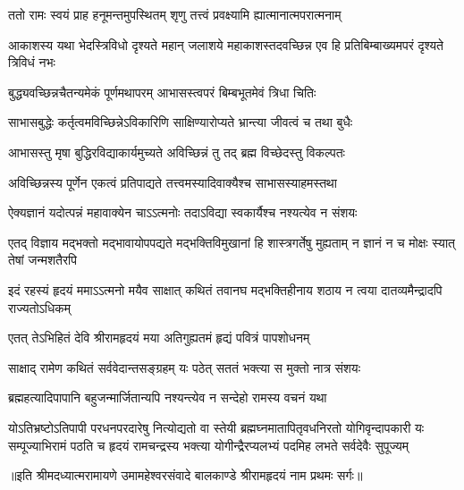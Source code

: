 \twolineshloka
{ततो रामः स्वयं प्राह हनूमन्तमुपस्थितम्}
{शृणु तत्त्वं प्रवक्ष्यामि ह्यात्मानात्मपरात्मनाम्} %

\threelineshloka
{आकाशस्य यथा भेदस्त्रिविधो दृश्यते महान्}
{जलाशये महाकाशस्तदवच्छिन्न एव हि}
{प्रतिबिम्बाख्यमपरं दृश्यते त्रिविधं नभः} %

\twolineshloka
{बुद्ध्यवच्छिन्नचैतन्यमेकं पूर्णमथापरम्}
{आभासस्त्वपरं बिम्बभूतमेवं त्रिधा चितिः} %

\twolineshloka
{साभासबुद्धेः कर्तृत्वमविच्छिन्नेऽविकारिणि}
{साक्षिण्यारोप्यते भ्रान्त्या जीवत्वं च तथा बुधैः} %

\twolineshloka
{आभासस्तु मृषा बुद्धिरविद्याकार्यमुच्यते}
{अविच्छिन्नं तु तद् ब्रह्म विच्छेदस्तु विकल्पतः} %

\twolineshloka
{अविच्छिन्नस्य पूर्णेन एकत्वं प्रतिपाद्यते}
{तत्त्वमस्यादिवाक्यैश्च साभासस्याहमस्तथा} %

\twolineshloka
{ऐक्यज्ञानं यदोत्पन्नं महावाक्येन चाऽऽत्मनोः}
{तदाऽविद्या स्वकार्यैश्च नश्यत्येव न संशयः} %

\threelineshloka
{एतद् विज्ञाय मद्भक्तो मद्भावायोपपद्यते}
{मद्भक्तिविमुखानां हि शास्त्रगर्तेषु मुह्यताम्}
{न ज्ञानं न च मोक्षः स्यात् तेषां जन्मशतैरपि} %

\fourlineindentedshloka
{इदं रहस्यं हृदयं ममाऽऽत्मनो}
{मयैव साक्षात् कथितं तवानघ}
{मद्भक्तिहीनाय शठाय न त्वया}
{दातव्यमैन्द्रादपि राज्यतोऽधिकम्} %


\twolineshloka
{एतत् तेऽभिहितं देवि श्रीरामहृदयं मया}
{अतिगुह्यतमं हृद्यं पवित्रं पापशोधनम्} %

\twolineshloka
{साक्षाद् रामेण कथितं सर्ववेदान्तसङ्ग्रहम्}
{यः पठेत् सततं भक्त्या स मुक्तो नात्र संशयः} %

\twolineshloka
{ब्रह्महत्यादिपापानि बहुजन्मार्जितान्यपि}
{नश्यन्त्येव न सन्देहो रामस्य वचनं यथा} %

\fourlineindentedshloka
{योऽतिभ्रष्टोऽतिपापी परधनपरदारेषु नित्योद्यतो वा}
{स्तेयी ब्रह्मघ्नमातापितृवधनिरतो योगिवृन्दापकारी}
{यः सम्पूज्याभिरामं पठति च हृदयं रामचन्द्रस्य भक्त्या}
{योगीन्द्रैरप्यलभ्यं पदमिह लभते सर्वदेवैः सुपूज्यम्} %

{॥इति श्रीमदध्यात्मरामायणे उमामहेश्वरसंवादे बालकाण्डे
श्रीरामहृदयं नाम प्रथमः सर्गः॥}
